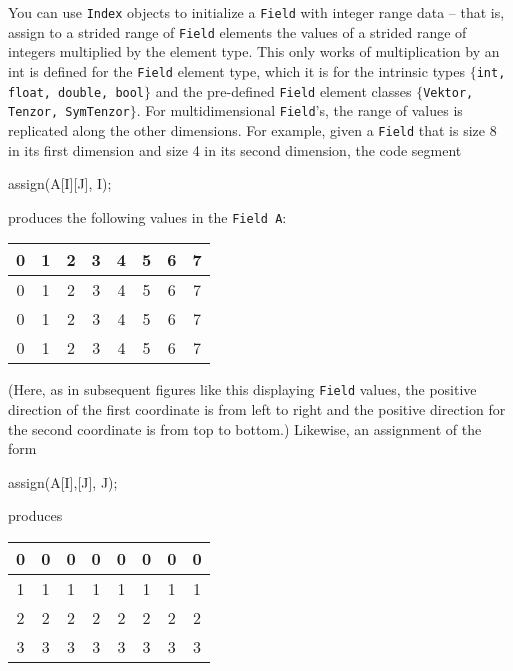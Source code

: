 You can use \texttt{Index} objects to initialize a \texttt{Field} with integer range data -- that is, assign to a strided range of \texttt{Field} elements the values of a strided range of integers multiplied by the element type. This only works of multiplication by an int is defined for the \texttt{Field} element type, which it is for the intrinsic types $\{$\texttt{int, float, double, bool}$\}$ and the \ippl pre-defined \texttt{Field} element classes $\{$\texttt{Vektor, Tenzor,
SymTenzor}$\}$. For multidimensional \texttt{Field}'s, the range of values is replicated along
the other dimensions. For example, given a \texttt{Field} that is size 8 in its first dimension and size 4 in its second dimension, the code segment
\begin{smallcode}
assign(A[I][J], I);
\end{smallcode}
produces the following values in the \texttt{Field A}:
%
   \begin{center}
        \begin{tabular}{|c|c|c|c|c|c|c|c|}
        \hline
        0 & 1 & 2 & 3 & 4 & 5 & 6 & 7 \\
        \hline
        0 & 1 & 2 & 3 & 4 & 5 & 6 & 7 \\        \hline
        0 & 1 & 2 & 3 & 4 & 5 & 6 & 7 \\        \hline
        0 & 1 & 2 & 3 & 4 & 5 & 6 & 7 \\        \hline
        \end{tabular}
   \label{tbl:t1}
   \end{center}
%
(Here, as in subsequent figures like this displaying \texttt{Field} values, the positive direction of the first coordinate is from left to right and the positive direction for the second coordinate is from top to bottom.) Likewise, an assignment of the form
\begin{smallcode}
assign(A[I],[J], J);
\end{smallcode}
produces
%
   \begin{center}
        \begin{tabular}{|c|c|c|c|c|c|c|c|}
        \hline
        0 & 0 & 0 & 0 & 0 & 0 & 0 & 0 \\        \hline
        1 & 1 & 1 & 1 & 1 & 1 & 1 & 1 \\        \hline
        2 & 2 & 2 & 2 & 2 & 2 & 2 & 2 \\        \hline
        3 & 3 & 3 & 3 & 3 & 3 & 3 & 3 \\        \hline
        \end{tabular}
   \label{tbl:t2}
   \end{center}

